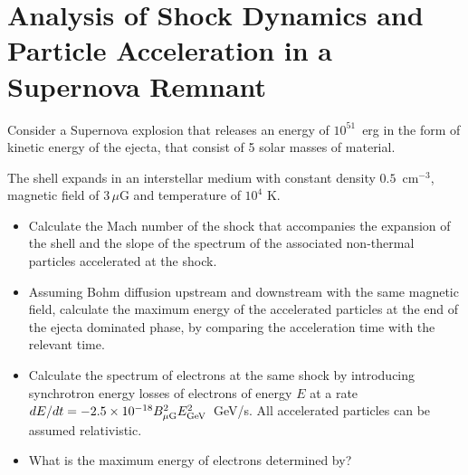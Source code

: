\section{Analysis of Shock Dynamics and Particle Acceleration in a Supernova Remnant}

Consider a Supernova explosion that releases an energy of $10^{51}$~erg in the form of kinetic energy of the ejecta, that consist of 5 solar masses of material. 

The shell expands in an interstellar medium with constant density $0.5$~cm$^{-3}$, magnetic field of $3\, \mu$G and temperature of $10^4$ K. 

\begin{itemize}
\item Calculate the Mach number of the shock that accompanies the expansion of the shell and the slope of the spectrum of
the associated non-thermal particles accelerated at the shock. 
\item Assuming Bohm diffusion upstream and downstream with the same magnetic field, calculate the maximum energy of the accelerated particles at the end of the ejecta dominated phase, by comparing the acceleration time with the
relevant time. 
\item Calculate the spectrum of electrons at the same shock by introducing synchrotron energy losses of electrons of energy $E$ at a rate \( dE/dt=-2.5 \times 10^{-18} B_{\mu \text{G}}^2 E_{\rm GeV}^2 \)~GeV/s. All accelerated particles can be assumed relativistic.
\item What is the maximum energy of electrons
determined by?
\end{itemize}
